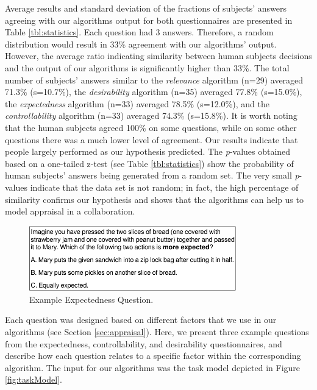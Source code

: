 Average results and standard deviation of the fractions of subjects' answers
agreeing with our algorithms output for both questionnaires are presented in
Table \ref{tbl:statistics}. Each question had 3 answers. Therefore, a random
distribution would result in 33\% agreement with our algorithms' output.
However, the average ratio indicating similarity between human subjects
decisions and the output of our algorithms is significantly higher than 33\%.
The total number of subjects' answers similar to the \textit{relevance}
algorithm (n=29) averaged 71.3\% (s=10.7\%), the \textit{desirability}
algorithm (n=35) averaged 77.8\% (s=15.0\%), the \textit{expectedness}
algorithm (n=33) averaged 78.5\% (s=12.0\%), and the \textit{controllability}
algorithm (n=33) averaged 74.3\% (s=15.8\%). It is worth noting that the human
subjects agreed 100\% on some questions, while on some other questions there
was a much lower level of agreement. Our results indicate that people largely
performed as our hypothesis predicted. The \textit{p}-values obtained based on a
one-tailed z-test (see Table \ref{tbl:statistics}) show the probability of human
subjects' answers being generated from a random set. The very small
\textit{p}-values indicate that the data set is not random; in fact, the high
percentage of similarity confirms our hypothesis and shows that the algorithms
can help us to model appraisal in a collaboration.

\begin{figure}[t]
  \vspace{-1mm}
  \centering
  \includegraphics[width=0.8\textwidth]{figure/question-sample-croped.pdf}
  \caption{{\fontsize{9}{9}\selectfont Example Expectedness Question.}}
  \label{fig:qs1}
  \vspace{-2mm}
\end{figure}

Each question was designed based on different factors that we use in our
algorithms (see Section \ref{sec:appraisal}). Here, we present three
example questions from the expectedness, controllability, and desirability
questionnaires, and describe how each question relates to a specific factor
within the corresponding algorithm. The input for our algorithms was the task
model depicted in Figure \ref{fig:taskModel}.

